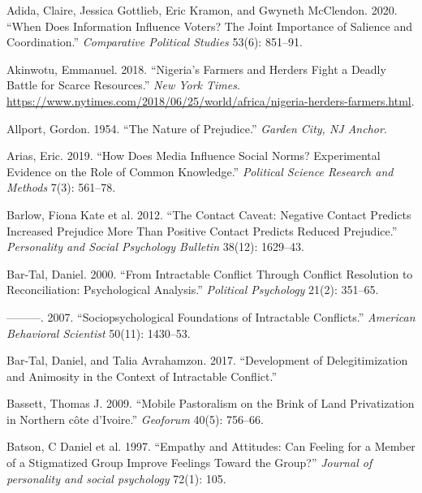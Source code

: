 \documentclass[11pt]{article}
\begin{document}
\hypertarget{refs}{}
\begin{cslreferences}
\leavevmode\hypertarget{ref-adida2020does}{}%
Adida, Claire, Jessica Gottlieb, Eric Kramon, and Gwyneth McClendon.
2020. ``When Does Information Influence Voters? The Joint Importance of
Salience and Coordination.'' \emph{Comparative Political Studies} 53(6):
851--91.

\leavevmode\hypertarget{ref-nyt2018nigeria}{}%
Akinwotu, Emmanuel. 2018. ``Nigeria's Farmers and Herders Fight a Deadly
Battle for Scarce Resources.'' \emph{New York Times}.
\url{https://www.nytimes.com/2018/06/25/world/africa/nigeria-herders-farmers.html}.

\leavevmode\hypertarget{ref-allport1954prejudice}{}%
Allport, Gordon. 1954. ``The Nature of Prejudice.'' \emph{Garden City,
NJ Anchor}.

\leavevmode\hypertarget{ref-arias2019does}{}%
Arias, Eric. 2019. ``How Does Media Influence Social Norms? Experimental
Evidence on the Role of Common Knowledge.'' \emph{Political Science
Research and Methods} 7(3): 561--78.

\leavevmode\hypertarget{ref-barlow2012contact}{}%
Barlow, Fiona Kate et al. 2012. ``The Contact Caveat: Negative Contact
Predicts Increased Prejudice More Than Positive Contact Predicts Reduced
Prejudice.'' \emph{Personality and Social Psychology Bulletin} 38(12):
1629--43.

\leavevmode\hypertarget{ref-bar2000intractable}{}%
Bar-Tal, Daniel. 2000. ``From Intractable Conflict Through Conflict
Resolution to Reconciliation: Psychological Analysis.'' \emph{Political
Psychology} 21(2): 351--65.

\leavevmode\hypertarget{ref-bar2007sociopsychological}{}%
---------. 2007. ``Sociopsychological Foundations of Intractable
Conflicts.'' \emph{American Behavioral Scientist} 50(11): 1430--53.

\leavevmode\hypertarget{ref-bar2017development}{}%
Bar-Tal, Daniel, and Talia Avrahamzon. 2017. ``Development of
Delegitimization and Animosity in the Context of Intractable Conflict.''

\leavevmode\hypertarget{ref-bassett2009mobile}{}%
Bassett, Thomas J. 2009. ``Mobile Pastoralism on the Brink of Land
Privatization in Northern côte d'Ivoire.'' \emph{Geoforum} 40(5):
756--66.

\leavevmode\hypertarget{ref-batson1997empathy}{}%
Batson, C Daniel et al. 1997. ``Empathy and Attitudes: Can Feeling for a
Member of a Stigmatized Group Improve Feelings Toward the Group?''
\emph{Journal of personality and social psychology} 72(1): 105.


\end{cslreferences}
\end{document}
